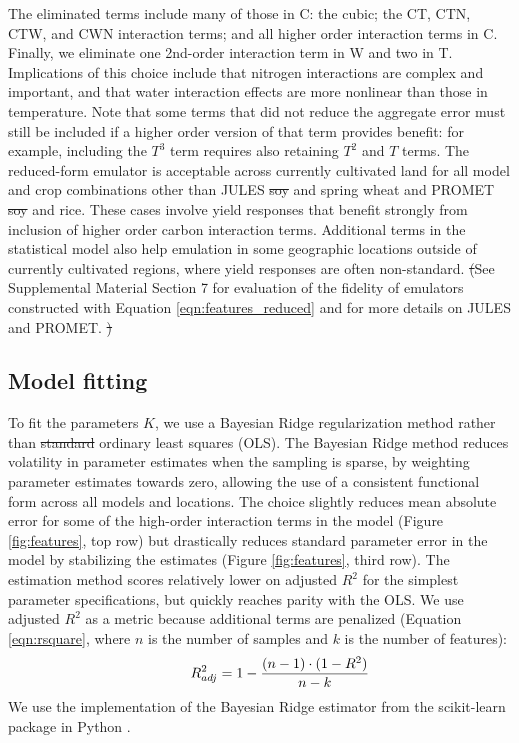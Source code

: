 \documentclass[gmdd]{copernicus} %
\providecommand{\DIFadd}[1]{{\protect\color{blue}\uwave{#1}}} %
\providecommand{\DIFdel}[1]{{\protect\color{red}\sout{#1}}}                      %
\providecommand{\DIFaddbegin}{} %
\providecommand{\DIFaddend}{} %
\providecommand{\DIFdelbegin}{} %
\providecommand{\DIFdelend}{} %
\begin{document}
\noindent The eliminated terms include many of those in C: the cubic; the CT, CTN, CTW, and CWN interaction terms; and all higher order interaction terms in C. 
Finally, we eliminate one 2nd-order interaction term in W and two in T. 
Implications of this choice include that nitrogen interactions are complex and important, and that water interaction effects are more nonlinear than those in temperature.  
Note that some terms that did not reduce the aggregate error must still be included if a higher order version of that term provides benefit: for example, including the $T^3$ term requires also retaining $T^2$ and $T$ terms. 
The reduced-form emulator is acceptable across currently cultivated land for all model and crop combinations other than JULES \DIFdelbegin \DIFdel{soy }\DIFdelend \DIFaddbegin \DIFadd{soybean }\DIFaddend and spring wheat and PROMET \DIFdelbegin \DIFdel{soy }\DIFdelend \DIFaddbegin \DIFadd{soybean }\DIFaddend and rice.
These cases involve yield responses that benefit strongly from inclusion of higher order carbon \DIFaddbegin \DIFadd{dioxide }\DIFaddend interaction terms. 
Additional terms in the statistical model also help emulation in some geographic locations outside of currently cultivated regions, where yield responses are often non-standard. 
\DIFdelbegin \DIFdel{(}\DIFdelend See Supplemental Material Section 7 for evaluation of the fidelity of emulators constructed with Equation \ref{eqn:features_reduced} and for more details on JULES and PROMET.
\DIFdelbegin \DIFdel{)
}\DIFdelend 

\subsection{Model fitting}
To fit the parameters $K$, we use a Bayesian Ridge regularization method \citep{MacKay91} rather than \DIFdelbegin \DIFdel{standard }\DIFdelend ordinary least squares (OLS). 
The Bayesian Ridge method reduces volatility in parameter estimates when the sampling is sparse, by weighting parameter estimates towards zero, allowing the use of a consistent functional form across all models and locations. 
The choice slightly reduces mean absolute error for some of the high-order interaction terms in the model (Figure \ref{fig:features}, top row) but drastically reduces standard parameter error in the model by stabilizing the estimates (Figure \ref{fig:features}, third row).
The estimation method scores relatively lower on adjusted $R^2$ for the simplest parameter specifications, but quickly reaches parity with the OLS. 
We use adjusted $R^2$ as a metric because additional terms are penalized (Equation \ref{eqn:rsquare}, where $n$ is the number of samples and $k$ is the number of features): 
\begin{equation}
    \centering
    \label{eqn:rsquare}
        \hspace{10mm} R^{2}_{adj} = 1 - \frac{(n-1) \cdot (1 - R^{2})}{n - k}
\end{equation}
We use the implementation of the Bayesian Ridge estimator from the scikit-learn package in Python \citep{scikit-learn}. 
\end{document}
